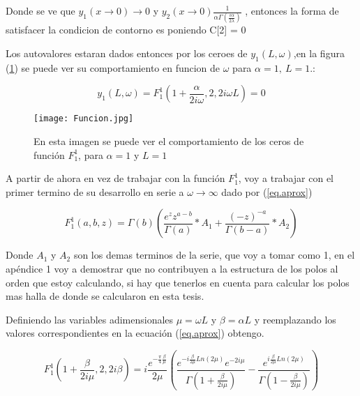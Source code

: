 Donde se ve que $y _1 (x \rightarrow 0 ) \rightarrow 0$ y $y _2 (x \rightarrow 0)  
\frac{1}{  \alpha   \Gamma ( \frac{i \alpha}{2 \lambda}  )   } $ , entonces la forma de satisfacer la condicion de contorno es poniendo C[2] = 0

Los autovalores estaran dados entonces por los ceroes de $y_1 (L,\omega)$,en la figura (\ref{fig:funcion}) se puede ver su comportamiento en funcion de $\omega$ para  $\alpha=1, \ L=1$.:


\begin{equation}
y_1 (L, \omega) = F _1 ^1 (1+\frac{ \alpha}{2 i \omega},2,2 i \omega L)  = 0
\end{equation}

\begin{figure}
\centering
\texttt{[image: Funcion.jpg]}
\caption{En esta imagen se puede ver el comportamiento de los ceros de función $F _1 ^1$, para $\alpha=1$ y $L=1$}
\label{fig:funcion}
\end{figure}

A partir de ahora en vez de trabajar con la función $F _1 ^1$, voy a trabajar con el primer termino de su desarrollo en serie a $ \omega \rightarrow \infty  $ dado por (\ref{eq.aprox}) 

\begin{equation}
    F _1 ^1 (a,b,z) = \Gamma (b) 
    \left(
    \frac{e^z z ^{a-b} }{\Gamma(a)} * A_1 + \frac{(-z) ^{ -a}}{ \Gamma(b-a)} 
    * A_2
    \right)
\label{eq.aprox}
\end{equation}

Donde $A_1$ y $A_2$ son los demas terminos de la serie, que voy a tomar como 1, en el apéndice 1 voy a demostrar que no contribuyen a la estructura de los polos al orden que estoy calculando, si hay que tenerlos en cuenta para calcular los polos mas halla de donde se calcularon en esta tesis.

Definiendo las variables adimensionales $\mu = \omega L$  y $\beta = \alpha L $ y reemplazando los valores correspondientes en la ecuación (\ref{eq.aprox}) obtengo. 

\begin{equation}
    F _1 ^1 (1+  \frac{  \beta}{2 i \mu} ,2 ,2 i \beta ) = 
   i  \frac{e ^{- \frac{\pi}{4} \frac{\beta}{\mu} } }{2 \mu}
    \left(
    \frac{e ^{- i \frac{\beta}{2 \mu} Ln(2 \mu) } e ^{-2 i \mu} }{\Gamma(1+\frac{ \beta}{2 i \mu})} - 
    \frac{e ^{  i \frac{\beta}{2 \mu} Ln(2 \mu) }}               {\Gamma(1-\frac{ \beta}{2 i \mu})}
    \right)
\label{eq.completa}
\end{equation}




